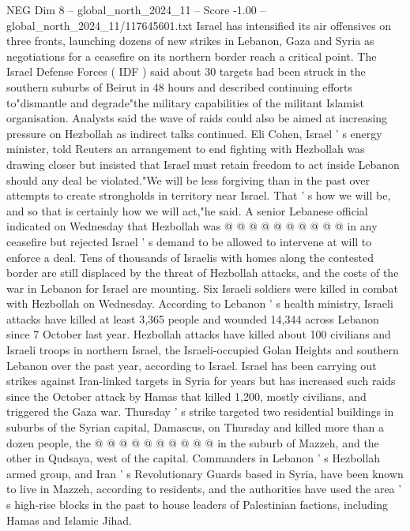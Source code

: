 \begin{textsample}{NEG Dim 8 – global\_north\_2024\_11 – Score -1.00 – global\_north\_2024\_11/117645601.txt}  \label{ex:f8_neg_305}
Israel has intensified its air offensives on three fronts, launching dozens of new strikes in Lebanon, Gaza and Syria as negotiations for a ceasefire on its northern border reach a critical point.
The Israel Defense Forces ( IDF ) said about 30 targets had been struck in the southern suburbs of Beirut in 48 hours and described continuing efforts to"dismantle and degrade"the military capabilities of the militant Islamist organisation.
Analysts said the wave of raids could also be aimed at increasing pressure on Hezbollah as indirect talks continued.
Eli Cohen, Israel ' s energy minister, told Reuters an arrangement to end fighting with Hezbollah was drawing closer but insisted that Israel must retain freedom to act inside Lebanon should any deal be violated."We will be less forgiving than in the past over attempts to create strongholds in territory near Israel.
That ' s how we will be, and so that is certainly how we will act,"he said.
A senior Lebanese official indicated on Wednesday that Hezbollah was @ @ @ @ @ @ @ @ @ @ in any ceasefire but rejected Israel ' s demand to be allowed to intervene at will to enforce a deal.
Tens of thousands of Israelis with homes along the contested border are still displaced by the threat of Hezbollah attacks, and the costs of the war in Lebanon for Israel are mounting.
Six Israeli soldiers were killed in combat with Hezbollah on Wednesday.
According to Lebanon ' s health ministry, Israeli attacks have killed at least 3,365 people and wounded 14,344 across Lebanon since 7 October last year.
Hezbollah attacks have killed about 100 civilians and Israeli troops in northern Israel, the Israeli-occupied Golan Heights and southern Lebanon over the past year, according to Israel.
Israel has been carrying out strikes against Iran-linked targets in Syria for years but has increased such raids since the October attack by Hamas that killed 1,200, mostly civilians, and triggered the Gaza war.
Thursday ' s strike targeted two residential buildings in suburbs of the Syrian capital, Damascus, on Thursday and killed more than a dozen people, the @ @ @ @ @ @ @ @ @ @ in the suburb of Mazzeh, and the other in Qudsaya, west of the capital.
Commanders in Lebanon ' s Hezbollah armed group, and Iran ' s Revolutionary Guards based in Syria, have been known to live in Mazzeh, according to residents, and the authorities have used the area ' s high-rise blocks in the past to house leaders of Palestinian factions, including Hamas and Islamic Jihad.

\end{textsample}
